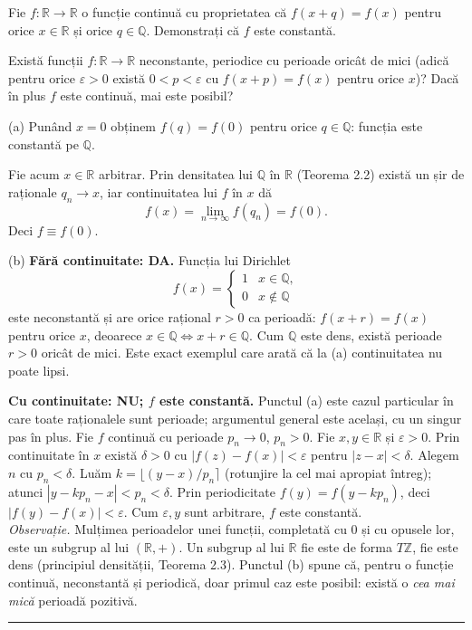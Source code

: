 \begin{parti}
  \item Fie $f:\mathbb{R}\to\mathbb{R}$ o funcție continuă cu proprietatea că $f(x+q)=f(x)$ pentru orice $x\in\mathbb{R}$ și orice $q\in\mathbb{Q}$. Demonstrați că $f$ este constantă.
  \item Există funcții $f:\mathbb{R}\to\mathbb{R}$ neconstante, periodice cu perioade oricât de mici (adică pentru orice $\varepsilon>0$ există $0<p<\varepsilon$ cu $f(x+p)=f(x)$ pentru orice $x$)? Dacă în plus $f$ este continuă, mai este posibil?
\end{parti}
\sol (a) Punând $x=0$ obținem $f(q)=f(0)$ pentru orice $q\in\mathbb{Q}$: funcția este constantă pe $\mathbb{Q}$.

Fie acum $x\in\mathbb{R}$ arbitrar. Prin densitatea lui $\mathbb{Q}$ în $\mathbb{R}$ (Teorema 2.2) există un șir de raționale $q_n\to x$, iar continuitatea lui $f$ în $x$ dă
\[ f(x)=\lim_{n\to\infty}f(q_n)=f(0) . \]
Deci $f\equiv f(0)$.

(b) \textbf{Fără continuitate: DA.} Funcția lui Dirichlet
\[
f(x)=\begin{cases}1 & x\in\mathbb{Q},\\ 0 & x\notin\mathbb{Q}\end{cases}
\]
este neconstantă și are orice rațional $r>0$ ca perioadă: $f(x+r)=f(x)$ pentru orice $x$, deoarece $x\in\mathbb{Q}\iff x+r\in\mathbb{Q}$. Cum $\mathbb{Q}$ este dens, există perioade $r>0$ oricât de mici. Este exact exemplul care arată că la (a) continuitatea nu poate lipsi.

\textbf{Cu continuitate: NU; $f$ este constantă.} Punctul (a) este cazul particular în care toate raționalele sunt perioade; argumentul general este același, cu un singur pas în plus. Fie $f$ continuă cu perioade $p_n\to0$, $p_n>0$. Fie $x,y\in\mathbb{R}$ și $\varepsilon>0$. Prin continuitate în $x$ există $\delta>0$ cu $|f(z)-f(x)|<\varepsilon$ pentru $|z-x|<\delta$. Alegem $n$ cu $p_n<\delta$. Luăm $k=\lfloor(y-x)/p_n\rceil$ (rotunjire la cel mai apropiat întreg); atunci $|y-kp_n-x|<p_n<\delta$. Prin periodicitate $f(y)=f(y-kp_n)$, deci $|f(y)-f(x)|<\varepsilon$. Cum $\varepsilon,y$ sunt arbitrare, $f$ este constantă.\\[2pt]
\emph{Observație.} Mulțimea perioadelor unei funcții, completată cu $0$ și cu opusele lor, este un subgrup al lui $(\mathbb{R},+)$. Un subgrup al lui $\mathbb{R}$ fie este de forma $T\mathbb{Z}$, fie este dens (principiul densității, Teorema 2.3). Punctul (b) spune că, pentru o funcție continuă, neconstantă și periodică, doar primul caz este posibil: există o \emph{cea mai mică} perioadă pozitivă.
\vspace{1mm}\hrule

